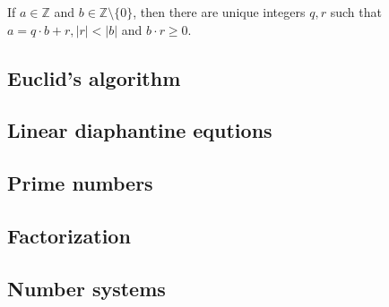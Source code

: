 \begin{theorem}
    If $ a \in \mathbb{Z} $ and $ b \in \mathbb{Z} \setminus \{0\} $, then
    there are unique integers $q,r$ such that $a = q \cdot b + r, |r|<|b|$
    and $ b \cdot r \ge 0 $.
\end{theorem}



\subsection{Euclid's algorithm}

\subsection{Linear diaphantine equtions}

\subsection{Prime numbers}

\subsection{Factorization}

\subsection{Number systems}